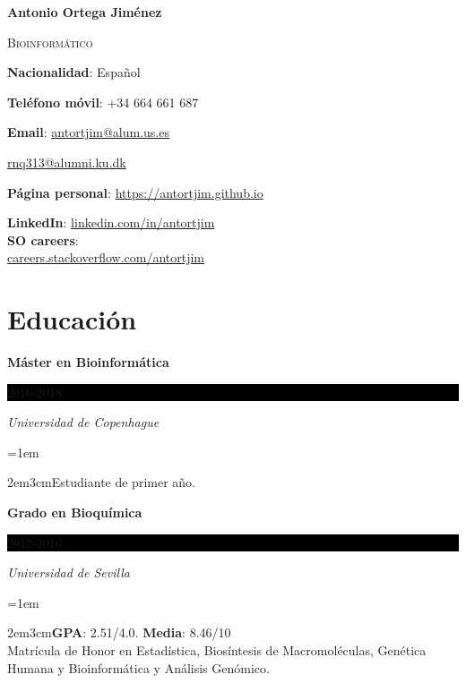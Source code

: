 \documentclass[paper=a4,fontsize=11pt]{article} %
\newcommand{\sepspace}{\vspace*{1em}}		%
\newcommand{\MyName}[1]{ %
		\Huge \usefont{OT1}{phv}{b}{n} \hfill #1
		\par \normalsize \normalfont}
\newcommand{\MySlogan}[1]{ %
		\large \usefont{OT1}{phv}{m}{n}\hfill \textit{#1}
		\par \normalsize \normalfont}
\newcommand{\NewPart}[1]{\section*{
									{#1}}}
\newcommand{\EducationEntry}[4]{
		\noindent \textbf{#1} \hfill      %
		\colorbox{Black}{%
			\parbox{6em}{%
			\hfill\color{White}#2}} \par  %
		\noindent \textit{#3} \par        %
		\noindent\hangindent=1em\hangafter=0 \small \begin{changemargin}{2em}{3cm}#4 \end{changemargin} %
		\normalsize \par}
\begin{document}

%


\def\name{\textcolor{StrongRed}{Antonio Ortega Jim\'enez}}

\centerline{\LARGE\bf \name}
\vspace{0.1in}
\centerline{\textcolor{awesome-red}{\textsc{Bioinformático}}}
\vspace{0.25in}



\begin{minipage}[t]{0.6\textwidth}
  \textbf{Nacionalidad}: Español \par
  \textbf{Teléfono móvil}: +34 664 661 687 \par
  \textbf{Email}: \href{mailto:antortjim@alum.us.es}{antortjim@alum.us.es} \par
  \leftskip=1.1cm  \href{mailto:rnq313@alumni.ku.dk}{rnq313@alumni.ku.dk} \par
  \leftskip=0cm \textbf{Página personal}: \href{https://antortjim.github.io}{https://antortjim.github.io} \par
  
\end{minipage}
\begin{minipage}[t]{0.3\textwidth}
  \textbf{LinkedIn}: \href{http://www.linkedin.com/in/antortjim}{linkedin.com/in/antortjim} \\
   \textbf{SO careers}:\\
   \href{http://careers.stackoverflow.com/antortjim}{careers.stackoverflow.com/antortjim} \\
\end{minipage}

\NewPart{Educación}{}

\EducationEntry{Máster en Bioinformática}{2016-2018}{Universidad de Copenhague}{Estudiante de primer año.}
\sepspace

\EducationEntry{Grado en Bioquímica}{2012-2016}{Universidad de Sevilla}{\textbf{GPA}: 2.51/4.0. \textbf{Media}: 8.46/10 \\
  Matrícula de Honor en Estadística, Biosíntesis de Macromoléculas, Genética Humana y Bioinformática y Análisis Genómico.}
\sepspace
  
\end{document}

